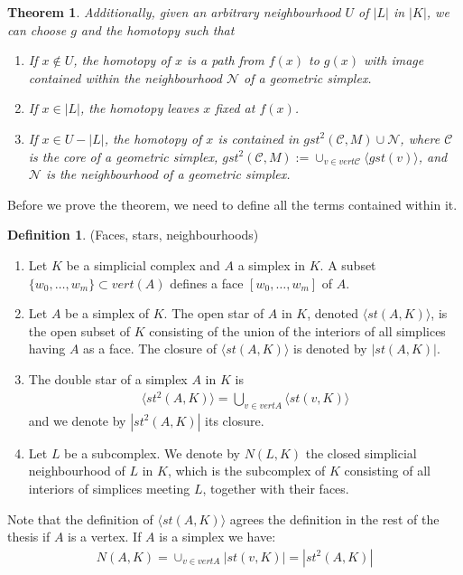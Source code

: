 \documentclass[a4paper,11pt]{article}
\theoremstyle{definition}
\newtheorem{definition}{Definition}[section]
\theoremstyle{plain}
\newtheorem*{theorem*}{Theorem}
\theoremstyle{remark}
\begin{document}
{\begin{theorem*}
Additionally, given an arbitrary neighbourhood $U$ of $|L|$ in $|K|$, we can choose $g$ and the homotopy such that
\begin{enumerate}
\item If $x\notin U$, the homotopy of $x$ is a path from $f(x)$ to $g(x)$ with image contained within the neighbourhood $ \mathcal{N}$ of a geometric simplex.
\item If $x\in |L|$, the homotopy leaves $x$ fixed at $f(x)$.
\item If $x\in U - |L|$, the homotopy of $x$ is contained in $gst^2(\mathscr{C},M)\cup \mathcal{N}$, where $\mathscr{C}$ is the core of a geometric simplex, $gst^2(\mathscr{C},M) := \cup_{v\in vert \mathscr{C}} \langle gst(v) \rangle$, and $ \mathcal{N}$ is the neighbourhood of a geometric simplex.
\end{enumerate}
\end{theorem*}

Before we prove the theorem, we need to define all the terms contained within it. 
\begin{definition} (Faces, stars, neighbourhoods) \begin{enumerate} 
\item Let $K$ be a simplicial complex and $A$ a simplex in $K$. A subset $\{w_{0}, \dots, w_{m}\}\subset vert(A)$ defines a face $[w_0,\dots, w_m]$ of $A$. 
\item Let $A$ be a simplex of $K$. The open star of $A$ in $K$, denoted $\langle st(A,K) \rangle$, is the open subset of $K$ consisting of the union of the interiors of all simplices having $A$ as a face. The closure of $\langle st(A,K) \rangle$ is denoted by $|st(A,K)|$. 
\item The double star of a simplex $A$ in $K$ is
\begin{align*}
\langle st^2(A,K) \rangle = \bigcup_{v \in vert A} \langle st(v,K) \rangle 
\end{align*}
and we denote by  $|st^2(A,K)|$ its closure. 
\item Let $L$ be a subcomplex. We denote by $N(L,K)$ the closed simplicial neighbourhood of $L$ in $K$, which is the subcomplex of $K$ consisting of all interiors of simplices meeting $L$, together with their faces.
\end{enumerate}
\end{definition}

Note that the definition of $\langle st (A,K)\rangle$ agrees the definition in the rest of the thesis if $A$ is a vertex. If $A$ is a simplex we have:
\begin{align*}
N(A,K) = \cup_{v\in vert A} |st(v,K)| = |st^2(A,K)|
\end{align*}

}
\end{document}
